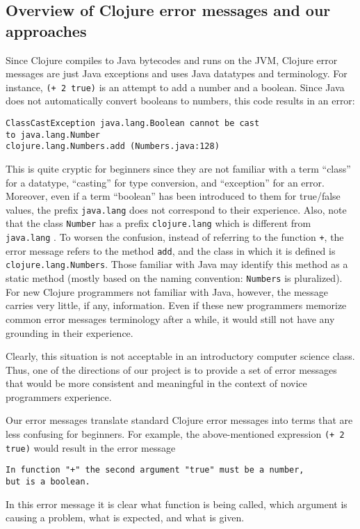 \documentclass[12pt]{article}
\begin{document}
\subsection{Overview of Clojure error messages and our approaches}
Since Clojure compiles to Java bytecodes and runs on the JVM, Clojure error messages are just Java exceptions
and uses Java datatypes and terminology. 
For instance, {\tt (+ 2 true)} is an attempt to add a number and a boolean. 
Since Java does not automatically convert booleans to numbers, this code results in an error:
\begin{verbatim}
ClassCastException java.lang.Boolean cannot be cast 
to java.lang.Number  
clojure.lang.Numbers.add (Numbers.java:128)
\end{verbatim} 
This is quite cryptic for beginners since they are not familiar with a term ``class'' for a datatype,
``casting'' for type conversion, and ``exception'' for an error. Moreover, even if a term ``boolean'' 
has been introduced to them for true/false values, the prefix {\tt  java.lang} does not 
correspond to their experience. Also, note that the class {\tt Number} has a prefix {\tt  clojure.lang}
which is different from {\tt  java.lang} . To worsen the confusion, instead of referring
to the function {\tt +}, the error message refers to the method {\tt add}, and the class 
in which it is defined is {\tt clojure.lang.Numbers}. Those familiar with Java may identify this
method as a static method (mostly based on the naming convention: {\tt Numbers} is pluralized). 
For new Clojure programmers not familiar with Java, however, the message carries very little, if any, information. 
Even if these new programmers memorize common error messages terminology after a while, 
it would still not have any grounding in their experience. 

Clearly, this situation is not acceptable in an introductory computer science class. Thus, one of the directions of our project is to 
provide a set of error messages that would be more consistent and meaningful in the context of 
novice programmers experience. 

Our error messages translate standard Clojure error messages into terms that are less confusing for beginners. 
For example, the above-mentioned expression  {\tt (+ 2 true)} would result in the error message
\begin{verbatim}
In function "+" the second argument "true" must be a number, 
but is a boolean. 
\end{verbatim} 
In this error message it is clear what function is being called, which argument is causing a problem, 
what is expected, and what is given. 
\end{document}
